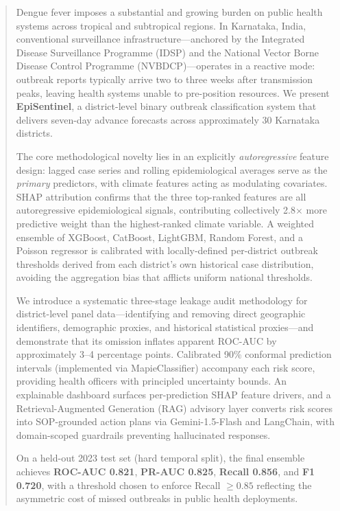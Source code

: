 \documentclass[conference]{IEEEtran}
\begin{document}
\begin{abstract}
Dengue fever imposes a substantial and growing burden on public
health systems across tropical and subtropical regions. In Karnataka,
India, conventional surveillance infrastructure---anchored by the
Integrated Disease Surveillance Programme (IDSP) and the National
Vector Borne Disease Control Programme (NVBDCP)---operates in a
reactive mode: outbreak reports typically arrive two to three weeks
after transmission peaks, leaving health systems unable to pre-position
resources. We present \textbf{EpiSentinel}, a district-level binary
outbreak classification system that delivers seven-day advance
forecasts across approximately 30 Karnataka districts.

The core methodological novelty lies in an explicitly
\emph{autoregressive} feature design: lagged case series and
rolling epidemiological averages serve as the \emph{primary}
predictors, with climate features acting as modulating covariates.
SHAP attribution confirms that the three top-ranked features are all
autoregressive epidemiological signals, contributing collectively
2.8$\times$ more predictive weight than the highest-ranked climate
variable. A weighted ensemble of XGBoost, CatBoost, LightGBM, Random
Forest, and a Poisson regressor is calibrated with locally-defined
per-district outbreak thresholds derived from each district's own
historical case distribution, avoiding the aggregation bias that
afflicts uniform national thresholds.

We introduce a systematic three-stage leakage audit methodology
for district-level panel data---identifying and removing direct
geographic identifiers, demographic proxies, and historical
statistical proxies---and demonstrate that its omission inflates
apparent ROC-AUC by approximately 3--4 percentage points.
Calibrated 90\% conformal prediction intervals (implemented via
MapieClassifier) accompany each risk score, providing health officers
with principled uncertainty bounds. An explainable dashboard surfaces
per-prediction SHAP feature drivers, and a Retrieval-Augmented
Generation (RAG) advisory layer converts risk scores into
SOP-grounded action plans via Gemini-1.5-Flash and LangChain,
with domain-scoped guardrails preventing hallucinated responses.

On a held-out 2023 test set (hard temporal split), the final ensemble
achieves \textbf{ROC-AUC 0.821}, \textbf{PR-AUC 0.825},
\textbf{Recall 0.856}, and \textbf{F1 0.720}, with a threshold chosen
to enforce Recall $\geq 0.85$ reflecting the asymmetric cost of missed
outbreaks in public health deployments.
\end{abstract}
\end{document}
